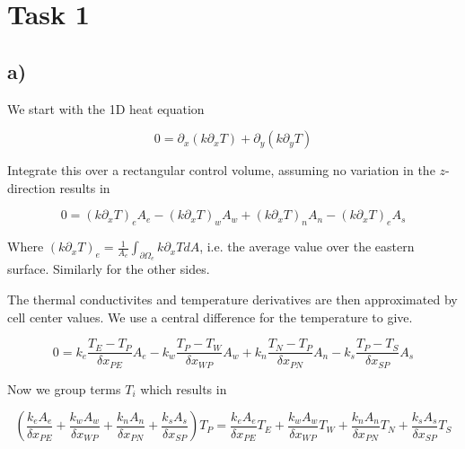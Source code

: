 \documentclass{article}
\begin{document}

\section{Task 1}

\subsection{a)}

We start with the 1D heat equation

\begin{equation}
0 = \partial_x (k \partial_x T) + \partial_y( k \partial_y  T)
\end{equation}

Integrate this over a rectangular control volume, assuming no variation in the $z$-direction results in

\begin{equation}
0 = (k \partial_x T)_e A_e - (k \partial_x T)_w A_w + (k \partial_x T)_n A_n - (k \partial_x T)_e A_s
\end{equation}

Where $(k \partial_x T)_e = \frac{1}{A_e}\int_{\partial \Omega_e} k \partial_x T dA$, i.e. the average value over the eastern surface. Similarly for the other sides.

The thermal conductivites and temperature derivatives are then approximated by cell center values. We use a central difference for the temperature to give.

\begin{equation}
0=k_e \frac{T_E - T_P}{\delta x_{PE} } A_e - k_w \frac{T_P - T_W}{\delta x_{WP} } A_w + k_n \frac{T_N - T_P}{\delta x_{PN} } A_n - k_s \frac{T_P - T_S}{\delta x_{SP} } A_s
\end{equation}

Now we group terms $T_i$ which results in

\begin{equation}
\left( \frac{k_e A_e}{\delta x_{PE}} + \frac{k_w A_w}{\delta x_{WP}} + \frac{k_n A_n}{\delta x_{PN}}  + \frac{k_s A_s}{\delta x_{SP}} \right) T_P = \frac{k_e A_e}{\delta x_{PE}} T_E + \frac{k_w A_w}{\delta x_{WP}} T_W + \frac{k_n A_n}{\delta x_{PN}} T_N + \frac{k_s A_s}{\delta x_{SP}} T_S
\end{equation}
\end{document}
